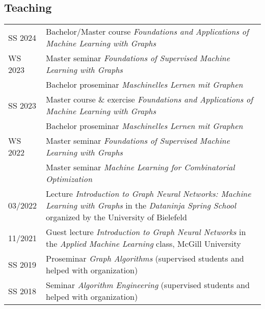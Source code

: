 \documentclass[11pt, a4paper, DIV=14, headings=small]{scrartcl}
\begin{document}
	\subsection*{Teaching}
	\begin{longtabu}{p{2.1cm}p{12.0cm}}
		SS 2024    & Bachelor/Master course \emph{Foundations and Applications of Machine Learning with Graphs}                                                                                   \\
		WS 2023    & Master seminar \emph{Foundations of Supervised Machine Learning with Graphs}          \\    
			       & Bachelor proseminar \emph{Maschinelles Lernen mit Graphen}                                                                                                               \\
		SS 2023    & Master course \& exercise \emph{Foundations and Applications of Machine Learning with Graphs}                                                                                   \\
		& Bachelor proseminar \emph{Maschinelles Lernen mit Graphen}                                                                                                                      \\
		WS 2022    & Master seminar \emph{Foundations of Supervised Machine Learning with Graphs}                                                                                                    \\
		& Master seminar \emph{Machine Learning for Combinatorial Optimization}                                                                                                           \\
		03/2022    & Lecture \emph{Introduction to Graph Neural Networks: Machine Learning with Graphs} in the \emph{Dataninja Spring School} organized by the University of Bielefeld               \\
		11/2021    & Guest lecture \emph{Introduction to Graph Neural Networks} in the \emph{Applied Machine Learning} class, McGill University                                                      \\
		SS 2019    & Proseminar \emph{Graph Algorithms} (supervised students and helped with organization)                                                                                           \\
		SS 2018    & Seminar \emph{Algorithm Engineering} (supervised students and helped with organization)                                                                                         \\

\end{longtabu}
\end{document}
